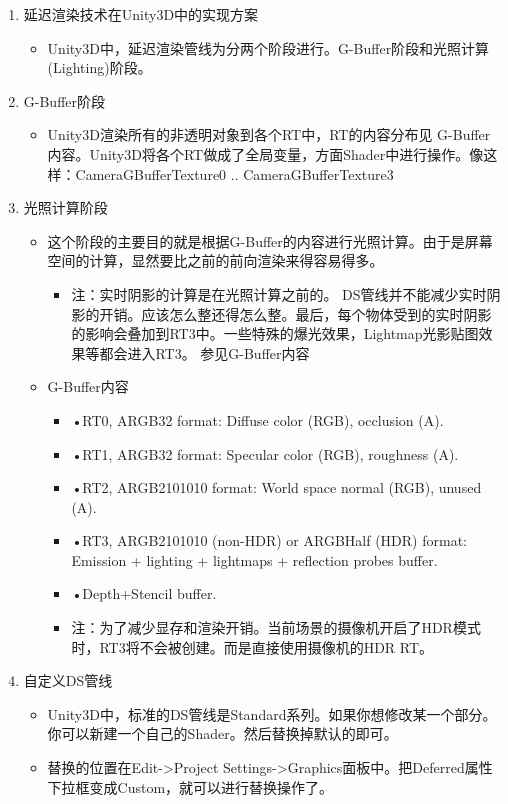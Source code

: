 \documentclass[9pt, b5paper]{article}
\begin{document}
\begin{enumerate}
\begin{itemize}
\end{itemize}
\item 延迟渲染技术在Unity3D中的实现方案
\label{sec:org5c22ff8}
\begin{itemize}
\item Unity3D中，延迟渲染管线为分两个阶段进行。G-Buffer阶段和光照计算(Lighting)阶段。
\end{itemize}
\item G-Buffer阶段
\label{sec:org7c018bc}
\begin{itemize}
\item Unity3D渲染所有的非透明对象到各个RT中，RT的内容分布见 G-Buffer内容。Unity3D将各个RT做成了全局变量，方面Shader中进行操作。像这样：CameraGBufferTexture0 .. CameraGBufferTexture3
\end{itemize}
\item 光照计算阶段
\label{sec:org7c64973}
\begin{itemize}
\item 这个阶段的主要目的就是根据G-Buffer的内容进行光照计算。由于是屏幕空间的计算，显然要比之前的前向渲染来得容易得多。
\begin{itemize}
\item 注：实时阴影的计算是在光照计算之前的。 DS管线并不能减少实时阴影的开销。应该怎么整还得怎么整。最后，每个物体受到的实时阴影的影响会叠加到RT3中。一些特殊的爆光效果，Lightmap光影贴图效果等都会进入RT3。 参见G-Buffer内容
\end{itemize}
\item G-Buffer内容
\begin{itemize}
\item •RT0, ARGB32 format: Diffuse color (RGB), occlusion (A).
\item •RT1, ARGB32 format: Specular color (RGB), roughness (A).
\item •RT2, ARGB2101010 format: World space normal (RGB), unused (A).
\item •RT3, ARGB2101010 (non-HDR) or ARGBHalf (HDR) format: Emission + lighting + lightmaps + reflection probes buffer.
\item •Depth+Stencil buffer.
\item 注：为了减少显存和渲染开销。当前场景的摄像机开启了HDR模式时，RT3将不会被创建。而是直接使用摄像机的HDR RT。
\end{itemize}
\end{itemize}
\item 自定义DS管线
\label{sec:org2713897}
\begin{itemize}
\item Unity3D中，标准的DS管线是Standard系列。如果你想修改某一个部分。你可以新建一个自己的Shader。然后替换掉默认的即可。
\item 替换的位置在Edit->Project Settings->Graphics面板中。把Deferred属性下拉框变成Custom，就可以进行替换操作了。
\end{itemize}


\end{enumerate}
\end{document}

